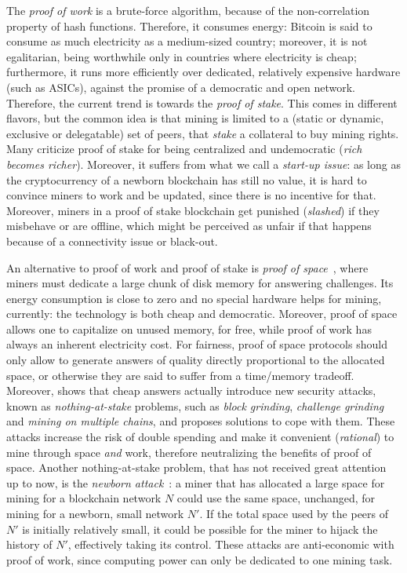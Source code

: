 The \emph{proof of work} is a brute-force algorithm,
because of the non-correlation property of hash functions.
Therefore, it consumes energy: Bitcoin is said to consume as much electricity as
a medium-sized country; moreover, it is not egalitarian, being
worthwhile only in countries where electricity is cheap; furthermore, it
runs more efficiently over dedicated, relatively expensive hardware (such as ASICs),
against the promise of a democratic and open network.
Therefore, the current trend is towards the \emph{proof of stake}.
This comes in different flavors, but
the common idea is that mining is limited to a (static or dynamic, exclusive or delegatable)
set of peers, that \emph{stake} a collateral to buy mining rights.
Many criticize proof of stake for being centralized and undemocratic
(\emph{rich becomes richer}).
Moreover, it suffers from what we call a \emph{start-up issue}: as long as the cryptocurrency
of a newborn blockchain has still no value, it is hard to convince miners to work and
be updated, since there is no incentive for that. Moreover, miners in
a proof of stake blockchain get punished (\emph{slashed}) if they misbehave or are offline, which
might be perceived as unfair if that happens because of a connectivity issue or black-out.

An alternative to proof of work and proof of stake is
\emph{proof of space}~\cite{AtenieseBFG14,DziembowskiFKP15}, where
miners must dedicate a large chunk of disk memory for answering challenges.
Its energy consumption is close to zero and no special
hardware helps for mining, currently: the technology is both cheap
and democratic. Moreover, proof of space allows
one to capitalize on unused memory, for free, while proof of work has always an
inherent electricity cost.
For fairness, proof of space protocols should only allow to generate answers of
quality directly proportional to the allocated space, or otherwise they are said
to suffer from a time/memory tradeoff.
Moreover, \cite{ParkKFGAP18} shows that
cheap answers actually introduce new security attacks,
known as \emph{nothing-at-stake} problems, such as \emph{block grinding},
\emph{challenge grinding} and \emph{mining on multiple chains},
and proposes solutions to cope with them.
These attacks increase the risk of double spending and make it convenient
(\emph{rational}) to mine through space \emph{and} work, therefore neutralizing the benefits
of proof of space.
Another nothing-at-stake problem, that has not received great attention up to now,
is the \emph{newborn attack}~\cite{TangZDWLG0L19}: a miner that has allocated a large space
for mining for a blockchain network $N$ could use the same space, unchanged, for
mining for a newborn, small network $N'$. If the total space used by the peers of $N'$ is
initially relatively small, it could be possible for the miner to hijack the history of $N'$,
effectively taking its control. These attacks are anti-economic with proof of work,
since computing power can only be dedicated to one mining task.

